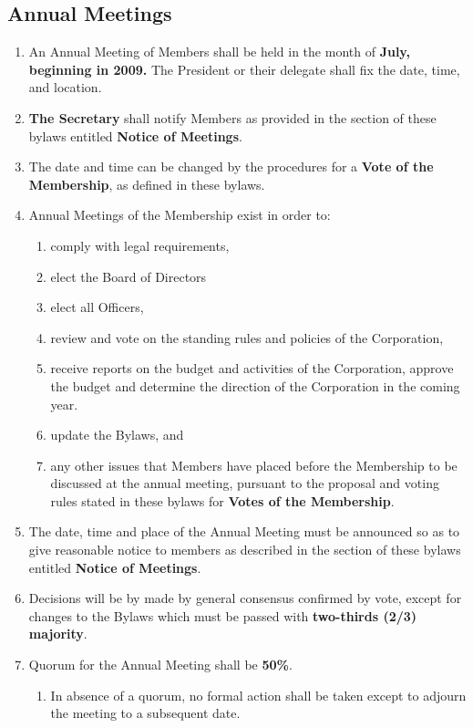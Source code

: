 \documentclass{article}
\begin{document}
\subsection{Annual Meetings}
\begin{enumerate}
    \item An Annual Meeting of Members shall be held in the month of \textbf{July, beginning in 2009.} The President or their delegate shall fix the date, time,
    and location.
    \item \textbf{The Secretary} shall notify Members as provided in the section of these
    bylaws entitled \textbf{Notice of Meetings}.
    \item The date and time can be changed by the procedures for a \textbf{Vote of the Membership}, as defined in these bylaws.
    \item Annual Meetings of the Membership exist in order to:
    \begin{enumerate}
        \item comply with legal requirements,
        \item elect the Board of Directors
        \item elect all Officers,
        \item review and vote on the standing rules and policies of the Corporation,
        \item receive reports on the budget and activities of the Corporation,
        approve the budget and determine the direction of the Corporation in the
        coming year.
        \item update the Bylaws, and
        \item any other issues that Members have placed before the Membership
        to be discussed at the annual meeting, pursuant to the proposal and
        voting rules stated in these bylaws for \textbf{Votes of the Membership}.
    \end{enumerate}
    \item The date, time and place of the Annual Meeting must be announced so as
    to give reasonable notice to members as described in the section of these
    bylaws entitled \textbf{Notice of Meetings}.
    \item Decisions will be by made by general consensus confirmed by vote,
    except for changes to the Bylaws which must be passed with \textbf{two-thirds (2/3) majority}.
    \item Quorum for the Annual Meeting shall be \textbf{50\%}.
    \begin{enumerate}
        \item In absence of a quorum, no formal action shall be taken except to
        adjourn the meeting to a subsequent date.
    \end{enumerate}
\end{enumerate}
\end{document}
